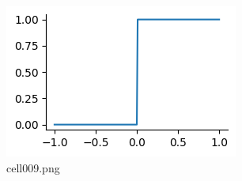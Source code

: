 \begin{figure}[ht]
	\centering
	\includegraphics[scale=0.8, max width=\linewidth]{./fig/local-learning-rule/logistic-regression-perceptron/cell009.png}
	\caption{cell009.png}
	\label{cell009.png}
\end{figure}